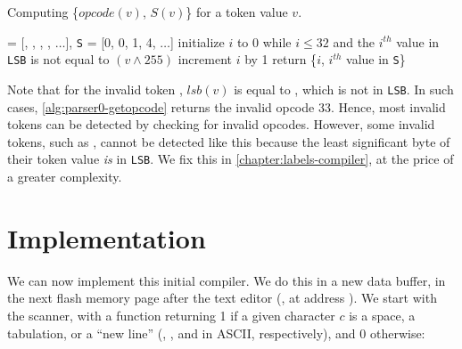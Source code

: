 
\begin{Algorithm}
\caption{Computing \{$opcode(v)$, $S(v)$\} for a token value
$v$.}\label{alg:parser0-getopcode}
\begin{algorithmic}[1]
 = [, ,
, , $\ldots$], {\tt S} = [0,
0, 1, 4, $\ldots$]
\State initialize $i$ to 0
\Begin while $i \le 32$ and the $i^{th}$ value in {\tt LSB} is not equal to $(v
\wedge 255)$
  \State increment $i$ by 1
\End
\State return \{$i$, $i^{th}$ value in {\tt S}\}
\end{algorithmic}
\end{Algorithm}

Note that for the invalid token , $lsb(v)$ is equal to
, which is not in {\tt LSB}. In such cases,
\cref{alg:parser0-getopcode} returns the invalid opcode 33. Hence, most invalid
tokens can be detected by checking for invalid opcodes. However, some invalid
tokens, such as , cannot be detected like this because the least
significant byte of their token value {\em is} in {\tt LSB}. We fix this in
\cref{chapter:labels-compiler}, at the price of a greater complexity.

\section{Implementation}\label{section:toyc0-implementation}


We can now implement this initial compiler. We do this in a new data buffer, in
the next flash memory page after the text editor (\ie, at address
). We start with the scanner, with a function
returning 1 if a given character $c$ is a space, a tabulation, or a ``new line''
(, , and  in ASCII, respectively), and 0 otherwise:

